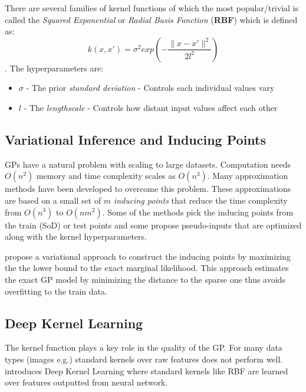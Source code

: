 \documentclass[fourier]{_style/dissertation}
\begin{document}
There are several families of kernel functions of which the most popular/trivial is called the \textit{Squared Exponential} or \textit{Radial Basis Function} (\textbf{RBF}) which is defined as: \\
$$k(x,x')=\sigma^{2} exp(-\frac{\lVert x-x' \rVert ^{2}}{2l^{2}})$$. The hyperparameters are: \\
\begin{itemize}
    \item $\sigma$ - The prior \textit{standard deviation} - Controls each individual values vary
    \item $l$ - The \textit{lengthscale} - Controls how distant input values affect each other
\end{itemize}

\subsection{Variational Inference and Inducing Points}
GPs have a natural problem with scaling to large datasets. Computation needs $O(n^{2})$ memory and   time complexity scales as $O(n^{3})$. Many approximation methods have been developed to overcome this problem. These approximations are based on a small set of $m$ \textit{inducing points} that reduce the time complexity from $O(n^{3})$ to $O(nm^{2})$. Some of the methods pick the inducing points from the train (SoD) or test points and some propose pseudo-inputs that are optimized along with the kernel hyperparameters. 

\cite{pmlr-v5-titsias09a} propose a variational approach to construct the inducing points by maximizing the the lower bound to the exact marginal likelihood. This approach estimates the exact GP model by minimizing the distance to the sparse one  thus avoids overfitting to the train data.

\subsection{Deep Kernel Learning}
The kernel function plays a key role in the quality of the GP. For many data types (images e.g.) standard kernels over raw features does not perform well. \cite{Wilson2015DeepLearning} introduces Deep Kernel Learning where standard kernels like RBF are learned over features outputted from neural network.
\end{document}
